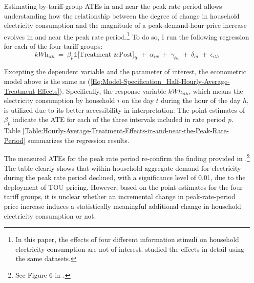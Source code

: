Estimating by-tariff-group ATEs in and near the peak rate period allows understanding how the relationship between the degree of change in household electricity consumption and the magnitude of a peak-demand-hour price increase evolves in and near the peak rate period.\footnote{In this paper, the effects of four different information stimuli on household electricity consumption are not of interest. \cite{The-Effect-of-Information-on-TOU-Electricity-Use:An-Irish-Residential-Study_Pon_2017} studied the effects in detail using the same datasets.} To do so, I run the following regression for each of the four tariff groups:
\begin{equation}
    \textit{kWh}_{ith} \ 
     = \ \beta_{p} \mathbb{1}\big[ \text{Treatment \& Post} \big]_{it} \ + \ \alpha_{iw} \ + \ \gamma_{tw} \ + \ \delta_{m} \ + \ \epsilon_{ith}
\label{Eq:Model-Specification_Hourly-Average-Treatment-Effects}
\end{equation}

Excepting the dependent variable and the parameter of interest, the econometric model above is the same as (\ref{Eq:Model-Specification_Half-Hourly-Average-Treatment-Effects}). Specifically, the response variable $kWh_{ith}$, which means the electricity consumption by household $i$ on the day $t$ during the hour of the day $h$, is utilized due to its better accessibility in interpretation. The point estimates of $\beta_{p}$ indicate the ATE for each of the three intervals included in rate period $p$. Table \ref{Table:Hourly-Average-Treatment-Effects-in-and-near-the-Peak-Rate-Period} summarizes the regression results.

The measured ATEs for the peak rate period re-confirm the finding provided in \cite{Peaking-Interest:How-Awareness-Drives-the-Effectiveness-of-Time-of-Use-Electricity-Pricing_Prest_2020}.\footnote{See Figure 6 in \cite{Peaking-Interest:How-Awareness-Drives-the-Effectiveness-of-Time-of-Use-Electricity-Pricing_Prest_2020}.} The table clearly shows that within-household aggregate demand for electricity during the peak rate period declined, with a significance level of 0.01, due to the deployment of TOU pricing. However, based on the point estimates for the four tariff groups, it is unclear whether an incremental change in peak-rate-period price increase induces a statistically meaningful additional change in household electricity consumption or not. 

